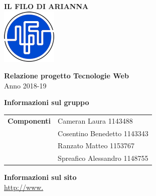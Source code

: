 \begin{center}
	\textbf{\Huge{IL FILO DI ARIANNA}}\\
	\vspace{15pt}
	\includegraphics{../img/logo.png}
\end{center}

\vspace{1.5cm}

\begin{center}
	\textbf{\huge{Relazione progetto Tecnologie Web}}\\[0.2cm]
	\Large{Anno 2018-19}
\end{center}

\vspace{5pt}

\begin{center}
	\textbf{\Large{Informazioni sul gruppo}}
\begin{table}[H]
	\hspace{3.5cm}
	\renewcommand{\arraystretch}{1.4}
	\begin{tabular}{l | l}
		\textbf{Componenti} & Cameran Laura 1143488\\
		& Cosentino Benedetto 1143343\\
		& Ranzato Matteo 1153767\\
		& Spreafico Alessandro 1148755\\
	\end{tabular}
\end{table}
\end{center}

\hspace{5pt}

\begin{center}
	\textbf{\Large{Informazioni sul sito}}\\
	\url{http://www.}
\end{center}